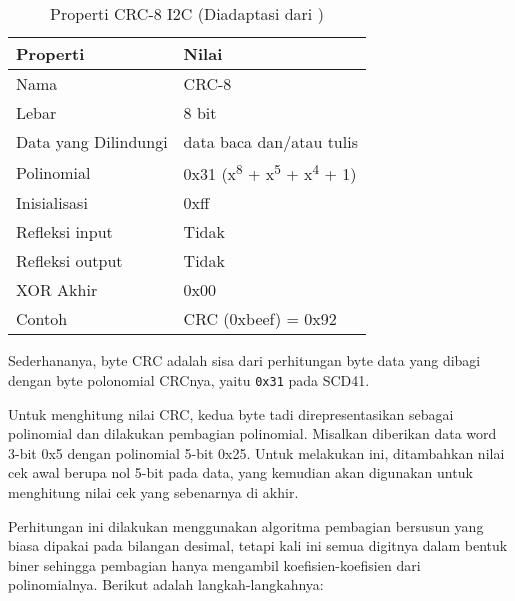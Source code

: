             \begin{table}[H]
            \centering
            \caption{Properti CRC-8 I2C (Diadaptasi dari \cite{scd4x_datasheet})}
            \label{tabel:properti_crc8}
            \begin{tabular}{|l|l|}
            \hline
            \textbf{Properti}       & \textbf{Nilai}                      \\ \hline
            Nama                    & CRC-8                               \\ \hline
            Lebar                   & 8 bit                               \\ \hline
            Data yang Dilindungi    & data baca dan/atau tulis            \\ \hline
            Polinomial              & 0x31 (x\textsuperscript{8} + x\textsuperscript{5} + x\textsuperscript{4} + 1) \\ \hline
            Inisialisasi            & 0xff                                \\ \hline
            Refleksi input          & Tidak                                \\ \hline
            Refleksi output         & Tidak                                \\ \hline
            XOR Akhir               & 0x00                                \\ \hline
            Contoh                  & CRC (0xbeef) = 0x92                 \\ \hline
            \end{tabular}
            \end{table}

        Sederhananya, byte CRC adalah sisa dari perhitungan byte data yang dibagi dengan byte polonomial CRCnya, yaitu \texttt{0x31} pada SCD41.

        Untuk menghitung nilai CRC, kedua byte tadi direpresentasikan sebagai polinomial dan dilakukan pembagian polinomial. Misalkan diberikan data word 3-bit 0x5 dengan polinomial 5-bit 0x25. Untuk melakukan ini, ditambahkan nilai cek awal berupa nol 5-bit pada data, yang kemudian akan digunakan untuk menghitung nilai cek yang sebenarnya di akhir.

        Perhitungan ini dilakukan menggunakan algoritma pembagian bersusun yang biasa dipakai pada bilangan desimal, tetapi kali ini semua digitnya dalam bentuk biner sehingga pembagian hanya mengambil koefisien-koefisien dari polinomialnya. Berikut adalah langkah-langkahnya:

